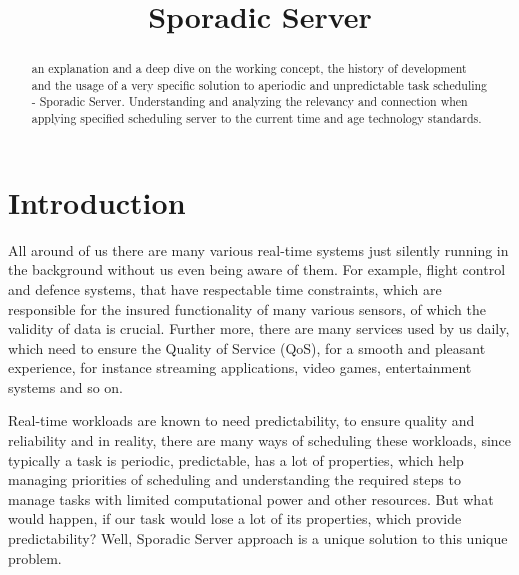 \documentclass[conference]{IEEEtran}
\begin{document}
\title{Sporadic Server}

\author{
}

\maketitle

\begin{abstract}
an explanation and a deep dive on the working concept, the history of development and the usage of a very specific solution to aperiodic and unpredictable task scheduling - Sporadic Server. Understanding and analyzing the relevancy and connection when applying specified scheduling server to the current time and age technology standards.
\end{abstract}
    


\thispagestyle{firstpagefooter}

\section{Introduction}
All around of us there are many various real-time systems just silently running in the background without us even being aware of them. For example, flight control and defence systems, that have respectable time constraints, which are responsible for the insured functionality of many various sensors, of which the validity of data is crucial. Further more, there are many services used by us daily, which need to ensure the Quality of Service (QoS), for a smooth and pleasant experience, for instance streaming applications, video games, entertainment systems and so on.

Real-time workloads are known to need predictability, to ensure quality and reliability and in reality, there are many ways of scheduling these workloads, since typically a task is periodic, predictable, has a lot of properties, which help managing priorities of scheduling and understanding the required steps to manage tasks with limited computational power and other resources. But what would happen, if our task would lose a lot of its properties, which provide predictability? Well, Sporadic Server approach is a unique solution to this unique problem. 
\end{document}
